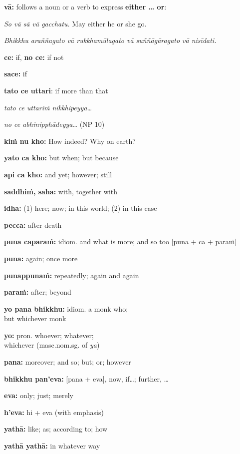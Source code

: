 \documentclass[11pt,oneside]{memoir}
\begin{document}
\begin{multicols}{2}

\textbf{vā:} follows a noun or a verb to express \textbf{either \ldots{} or}:

\emph{So vā sā vā gacchatu.} May either he or she go.

\emph{Bhikkhu araññagato vā rukkhamūlagato vā suññāgāragato vā nisīdati.}

\textbf{ce:} if, \textbf{no ce:} if not

\textbf{sace:} if

\textbf{tato ce uttari}: if more than that

\emph{tato ce uttariṁ nikkhipeyya\ldots{}}

\emph{no ce abhinipphādeyya\ldots{}} (NP 10)

\textbf{kiṁ nu kho:} How indeed? Why on earth?

\textbf{yato ca kho:} but when; but because

\textbf{api ca kho:} and yet; however; still

\textbf{saddhiṁ, saha:} with, together with

\textbf{idha:} (1) here; now; in this world; (2) in this case

\textbf{pecca:} after death

\columnbreak

\textbf{puna caparaṁ:} idiom. and what is more; and so too [puna + ca + paraṁ]

\textbf{puna:} again; once more

\textbf{punappunaṁ:} repeatedly; again and again

\textbf{paraṁ:} after; beyond

\textbf{yo pana bhikkhu:} idiom. a monk who;\\
but whichever monk

\textbf{yo:} pron. whoever; whatever;\\
whichever (masc.nom.sg. of \emph{ya})

\textbf{pana:} moreover; and so; but; or; however

\textbf{bhikkhu pan'eva:} {[}pana + eva], now, if\ldots{}; further, \ldots{}

\textbf{eva:} only; just; merely

\textbf{h'eva:} hi + eva (with emphasis)

\textbf{yathā:} like; as; according to; how

\textbf{yathā yathā:} in whatever way

\end{multicols}
\end{document}
